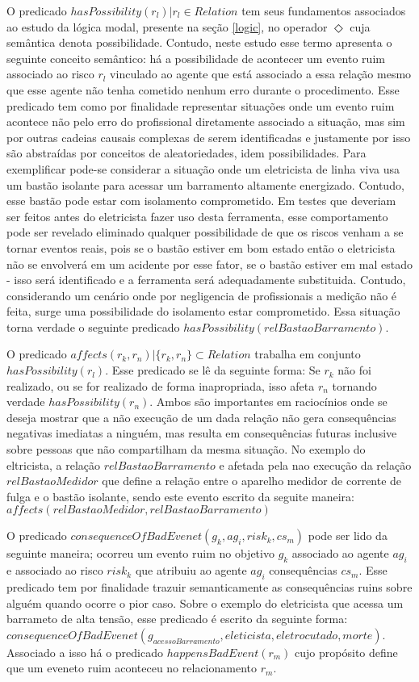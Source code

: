 O predicado $hasPossibility(r_l) | r_l \in Relation $ tem seus fundamentos associados ao estudo da lógica modal, presente na seção \ref{logic}, no operador 
$\Diamond$ cuja semântica denota possibilidade. Contudo, neste estudo esse termo apresenta o seguinte conceito semântico: há a possibilidade 
de acontecer um evento ruim associado ao risco $r_l$ vinculado ao agente que está associado a essa relação mesmo que esse agente 
não tenha cometido nenhum erro durante o procedimento. Esse predicado tem como por finalidade representar situações onde um evento 
ruim acontece não pelo erro do profissional diretamente associado a situação, mas sim por outras cadeias causais complexas de serem identificadas e justamente por isso 
são abstraídas por conceitos de aleatoriedades, idem possibilidades. Para 
exemplificar pode-se considerar a situação onde um eletricista de linha viva usa um bastão isolante para acessar um barramento altamente energizado.
Contudo, esse bastão pode estar com isolamento comprometido. Em testes que deveriam ser feitos antes do eletricista fazer uso desta ferramenta,
esse comportamento pode ser revelado eliminado qualquer possibilidade de que os riscos venham a se tornar eventos reais, pois se o bastão estiver em bom estado
então o eletricista não se envolverá em um acidente por esse fator, se o bastão estiver em mal estado - isso será identificado e a ferramenta 
será adequadamente substituida. Contudo, considerando um cenário onde por negligencia de profissionais a medição não é feita, surge 
uma possibilidade do isolamento estar comprometido. Essa situação torna verdade o seguinte predicado $hasPossibility(relBastaoBarramento)$.

O predicado $affects(r_k,r_n) | \{ r_k, r_n\} \subset Relation $ trabalha em conjunto $hasPossibility(r_l)$. Esse predicado se 
lê da seguinte forma: Se $r_k$ não foi realizado, ou se for realizado de forma inapropriada, isso afeta  $r_n$ tornando verdade 
$hasPossibility(r_n)$. Ambos são importantes em raciocínios onde se deseja mostrar que a não execução de um dada relação 
não gera consequências negativas imediatas a ninguém, mas resulta em consequências futuras inclusive sobre pessoas que não compartilham 
da mesma situação. No exemplo do eltricista, a relação $relBastaoBarramento$ e afetada pela nao execução da relação $relBastaoMedidor$ 
que define a relação entre o aparelho medidor de corrente de fulga e o bastão isolante, sendo este evento escrito da seguite maneira:
$affects(relBastaoMedidor,relBastaoBarramento)$

O predicado $consequenceOfBadEvenet(g_k, ag_i,risk_k,cs_m)$ pode ser lido da seguinte maneira; ocorreu um evento ruim no 
objetivo $g_k$ associado ao agente $ag_i$ e associado ao risco $risk_k$ que atribuiu ao agente $ag_i$ consequências $cs_m$. Esse 
predicado tem por finalidade trazuir semanticamente as consequências ruins sobre alguém quando ocorre o pior caso. Sobre o exemplo 
do eletricista que acessa um barrameto de alta tensão, esse predicado é escrito da seguinte forma:
$consequenceOfBadEvenet(g_{acessoBarramento}, eleticista,eletrocutado,morte)$. Associado a isso há o predicado $happensBadEvent(r_m)$
cujo propósito define que um eveneto ruim aconteceu no relacionamento $r_m$.


